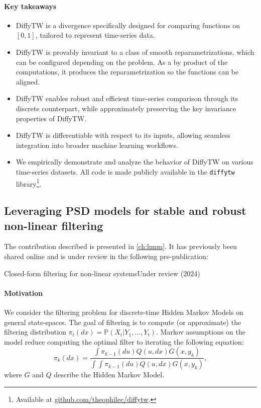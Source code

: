 \paragraph{Key takeaways}
\begin{itemize}
    \item DiffyTW is a divergence specifically designed for comparing functions on $[0,1]$, tailored to represent time-series data.
    \item DiffyTW is provably invariant to a class of smooth reparametrizations, which can be configured depending on the problem. As a by product of the computations, it produces the reparametrization so the functions can be aligned.
    \item DiffyTW enables robust and efficient time-series comparison through its discrete counterpart, while approximately preserving the key invariance properties of DiffyTW.
    \item DiffyTW is differentiable with respect to its inputs, allowing seamless integration into broader machine learning workflows.
    \item We empirically demonstrate and analyze the behavior of DiffyTW on various time-series datasets. All code is made publicly available in the \texttt{diffytw} library\footnote{Available at \url{github.com/theophilec/diffytw}.}.
\end{itemize}

\subsection{Leveraging PSD models for stable and robust non-linear filtering}
\begin{mdframed}
The contribution described is presented in \cref{ch:hmm}.
\noindent It has previously been shared online and is under review in the following pre-publication:
\begin{mdframed}
{Closed-form filtering for non-linear systems}{Under review (2024)}
\end{mdframed}
\end{mdframed}

\paragraph{Motivation}
We consider the filtering problem for discrete-time Hidden Markov Models on general state-spaces. The goal of filtering is to compute (or approximate) the filtering distribution $\pi_t(dx) = \mathbb P(X_t\vert Y_1, \ldots, Y_{t})$. Markov assumptions on the model reduce computing the optimal filter to iterating the following equation:
\begin{equation}\label{eq:intro-hmm-iteration}
\pi_k(dx) = \frac{\int \pi_{k-1}(du)Q(u, dx)G(x, y_k)}{\int \int \pi_{k-1}(du)Q(u, dx)G(x, y_k)},
\end{equation}
where $G$ and $Q$ describe the Hidden Markov Model.

